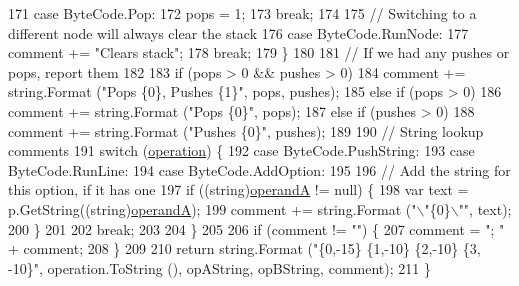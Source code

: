 \begin{DoxyCode}
171             \textcolor{keywordflow}{case} ByteCode.Pop:
172                 pops = 1;
173                 \textcolor{keywordflow}{break};
174             
175             \textcolor{comment}{// Switching to a different node will always clear the stack}
176             \textcolor{keywordflow}{case} ByteCode.RunNode:
177                 comment += \textcolor{stringliteral}{"Clears stack"};
178                 \textcolor{keywordflow}{break};
179             \}
180 
181             \textcolor{comment}{// If we had any pushes or pops, report them}
182 
183             \textcolor{keywordflow}{if} (pops > 0 && pushes > 0)
184                 comment += string.Format (\textcolor{stringliteral}{"Pops \{0\}, Pushes \{1\}"}, pops, pushes);
185             \textcolor{keywordflow}{else} \textcolor{keywordflow}{if} (pops > 0)
186                 comment += string.Format (\textcolor{stringliteral}{"Pops \{0\}"}, pops);
187             \textcolor{keywordflow}{else} \textcolor{keywordflow}{if} (pushes > 0)
188                 comment += string.Format (\textcolor{stringliteral}{"Pushes \{0\}"}, pushes);
189 
190             \textcolor{comment}{// String lookup comments}
191             \textcolor{keywordflow}{switch} (\hyperlink{a00058_a566bf5f7198cc353ea5c3710cb3a31cb}{operation}) \{
192             \textcolor{keywordflow}{case} ByteCode.PushString:
193             \textcolor{keywordflow}{case} ByteCode.RunLine:
194             \textcolor{keywordflow}{case} ByteCode.AddOption:
195 
196                 \textcolor{comment}{// Add the string for this option, if it has one}
197                 \textcolor{keywordflow}{if} ((\textcolor{keywordtype}{string})\hyperlink{a00058_ab5d386faa0d3dbc23db80f8e62706afd}{operandA} != null) \{
198                     var text = p.GetString((string)\hyperlink{a00058_ab5d386faa0d3dbc23db80f8e62706afd}{operandA});
199                     comment += string.Format (\textcolor{stringliteral}{"\(\backslash\)"\{0\}\(\backslash\)""}, text);
200                 \}
201 
202                 \textcolor{keywordflow}{break};
203             
204             \}
205 
206             \textcolor{keywordflow}{if} (comment != \textcolor{stringliteral}{""}) \{
207                 comment = \textcolor{stringliteral}{"; "} + comment;
208             \}
209 
210             \textcolor{keywordflow}{return} string.Format (\textcolor{stringliteral}{"\{0,-15\} \{1,-10\} \{2,-10\} \{3, -10\}"}, operation.ToString (), opAString, 
      opBString, comment);
211         \}
\end{DoxyCode}


